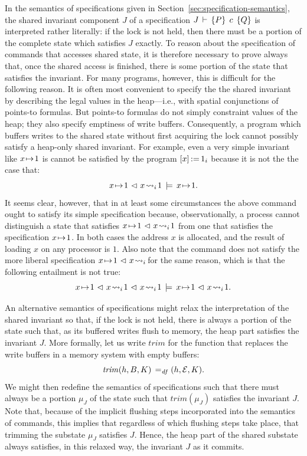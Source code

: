 \documentclass[11pt]{report}         %
\begin{document}
In the semantics of specifications given in Section~\ref{sec:specification-semantics}, the shared invariant component $J$ of a specification $J\,\vdash\,\left\lbrace P \right\rbrace\;c\;\left\lbrace Q \right\rbrace$ is interpreted rather literally: if the lock is not held, then there must be a portion of the complete state which satisfies $J$ exactly. To reason about the specification of commands that accesses shared state, it is therefore necessary to prove always that, once the shared access is finished, there is some portion of the state that satisfies the invariant. For many programs, however, this is difficult for the following reason. It is often most convenient to specify the the shared invariant by describing the legal values in the heap---i.e., with spatial conjunctions of points-to formulas. But points-to formulas do not simply constraint values of the heap; they also specify emptiness of write buffers. Consequently, a program which buffers writes to the shared state without first acquiring the lock cannot possibly satisfy a heap-only shared invariant. For example, even a very simple invariant like $x \!\mapsto\! 1$ is cannot be satisfied by the program $\left[ x \right] \operatorname{:\!=} 1_i$ because it is not the the case that: \[ x \!\mapsto\! 1 \operatorname{\,\vartriangleleft\,} x \!\leadsto_{i}\! 1 \,\models\, x \!\mapsto\! 1. \] It seems clear, however, that in at least some circumstances the above command ought to satisfy its simple specification because, observationally, a process cannot distinguish a state that satisfies $x \!\mapsto\! 1 \operatorname{\,\vartriangleleft\,} x \!\leadsto_{i}\! 1$ from one that satisfies the specification $x \!\mapsto\! 1$. In both cases the address $x$ is allocated, and the result of loading $x$ on any processor is $1$. Also note that the command does not satisfy the more liberal specification $x \!\mapsto\! 1 \operatorname{\,\vartriangleleft\,} x \!\leadsto_{i}\!$ for the same reason, which is that the following entailment is not true: \[ x \fpointsto 1 \fseq x \fwrite{i} 1 \fseq x \fwrite{i} 1 \sentails x \fpointsto 1 \fseq x \fwrite{i} 1. \]

An alternative semantics of specifications might relax the interpretation of the shared invariant so that, if the lock is not held, there is always a portion of the state such that, as its buffered writes flush to memory, the heap part satisfies the invariant $J$. More formally, let us write $\mathit{trim}$ for the function that replaces the write buffers in a memory system with empty buffers: \[ \mathit{trim}(h,B,K) \operatorname{\;=_{\mathit{df}}\;} (h,\mathcal{E},K).\] We might then redefine the semantics of specifications such that there must always be a portion $\mu_J$ of the state such that $\mathit{trim}(\mu_J)$ satisfies the invariant $J$. Note that, because of the implicit flushing steps incorporated into the semantics of commands, this implies that regardless of which flushing steps take place, that trimming the substate $\mu_J$ satisfies $J$. Hence, the heap part of the shared substate always satisfies, in this relaxed way, the invariant $J$ as it commits. 
\end{document}

